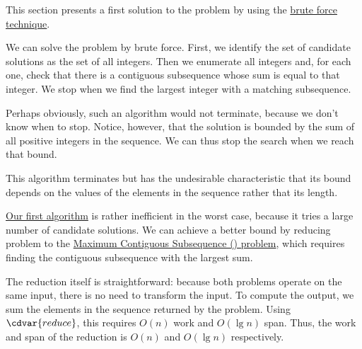 \begin{cluster}
\label{grp:grm:mcss::presents}

\begin{gram}
\label{grm:mcss::presents}
This section presents a first solution to the \MCSS{} problem by using
the \href{sec:design::bf}{brute force technique}.

\end{gram}
\end{cluster}

\begin{cluster}
\label{grp:alg:mcss::bf-alg::brutest}

\begin{algorithm}
\label{alg:mcss::bf-alg::brutest}

We can solve the \MCSS{} problem by brute force.
First, we identify the set of candidate solutions as the set of all
integers.
Then we enumerate all integers and, for each one, check that there is
a contiguous subsequence whose sum is equal to that integer.
We stop when we find the largest integer with a matching subsequence.


Perhaps obviously, such an algorithm would not terminate, because we
don't know when to stop.
Notice, however, that the solution is bounded by the sum of all
positive integers in the sequence.
We can thus stop the search when we reach that bound.

This algorithm terminates but has the undesirable characteristic that
its bound depends on the values of the elements in the sequence rather
that its length.

\end{algorithm}
\end{cluster}

\begin{cluster}
\label{grp:grm:mcss::reduction-to}

\begin{gram}
\label{grm:mcss::reduction-to}
\href{alg:mcss::bf-alg::brutest}{Our first algorithm} is rather
inefficient in the worst case, because it tries a large number of
candidate solutions.
We can achieve a better bound by reducing \MCSS{} problem to the
\href{def:mcss::introduction::mcss-problem}{Maximum Contiguous Subsequence (\MCS{}) problem}, which requires finding the contiguous subsequence with the
largest sum.

The reduction itself is straightforward: because both problems operate
on the same input, there is no need to transform the input.
To compute the output, we sum the elements in the sequence returned by
the \MCS{} problem.
Using $\cdvar{reduce}$, this requires $O(n)$ work and $O(\lg{n})$ span.
Thus, the work and span of the reduction is $O(n)$ and $O(\lg{n})$
respectively.

\end{gram}
\end{cluster}

